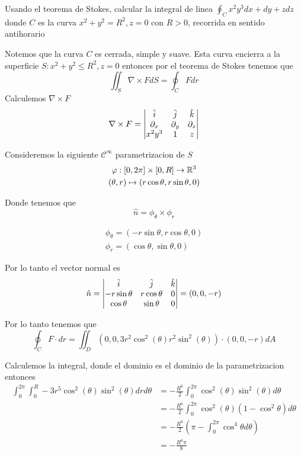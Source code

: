 \message{ !name(MAT024.tex)}\documentclass[../main.tex]{subfiles}
\begin{document}
\begin{problem}
Usando el teorema de Stokes, calcular la integral de linea $\oint_{C} x^{2}y^{3} dx + dy + z dz$ donde $C$ es la curva $x^{2} + y^{2} = R^{2}, z = 0$ con $R > 0$, recorrida en sentido antihorario
\end{problem}
\begin{solution}
  Notemos que la curva $C$ es cerrada, simple y suave. Esta curva encierra a la superficie $S: x^{2} + y^{2} \leq R^{2}, z = 0$ entonces por el teorema de Stokes tenemos que
  \begin{equation*}
    \iint_{S} \nabla \times F dS = \oint_{C} F dr
  \end{equation*}
  Calculemos $\nabla \times F$
  \begin{equation*}
    \nabla \times F = \begin{vmatrix} \hat{i} & \hat{j} & \hat{k}\\ \partial_x & \partial_y & \partial_z\\ x^{2}y^{3} & 1 & z\end{vmatrix}
  \end{equation*}

  Consideremos la siguiente $\mathcal{C}^{\infty}$ parametrizacion de $S$
  \begin{gather*}
    \varphi : [0, 2\pi] \times [0, R] \to \mathbb{R}^{3}\\
    (\theta, r) \mapsto (r \cos \theta, r \sin \theta, 0)
  \end{gather*}

  Donde tenemos que
  \begin{equation*}
    \hat{n} = \phi_{\theta} \times \phi_{r}
  \end{equation*}

  \begin{gather*}
    \phi_{\theta} = (-r \sin \theta, r \cos \theta, 0)\\
    \phi_{r} = (\cos \theta, \sin \theta, 0)
  \end{gather*}

  Por lo tanto el vector normal es
  \begin{equation*}
    \hat{n} = \begin{vmatrix} \hat{i} & \hat{j} & \hat{k}\\ -r \sin \theta & r \cos \theta & 0\\ \cos \theta & \sin \theta & 0\end{vmatrix} = (0, 0, -r)
  \end{equation*}

  Por lo tanto tenemos que
  \begin{equation*}
    \oint_{C} F \cdot dr = \iint_{D} (0, 0, 3r^{2}\cos^{2}(\theta) r^{2} \sin^{2}(\theta)) \cdot (0, 0, -r) dA
  \end{equation*}

  Calculemos la integral, donde el dominio es el dominio de la parametrizacion entonces
  \begin{align*}
    \int_{0}^{2\pi}\int_{0}^{R} -3r^{5}\cos^{2}(\theta)\sin^{2}(\theta) drd\theta &= -\frac{R^{6}}{2} \int_{0}^{2\pi}\cos^{2}(\theta)\sin^{2}(\theta) d\theta\\
                                                                                  &= -\frac{R^{6}}{2} \int_{0}^{2\pi} \cos^{2}(\theta)(1 - \cos^{2} \theta) d\theta\\
                                                                                  &= -\frac{R^{6}}{2} (\pi - \int_{0}^{2\pi} \cos^{4} \theta d \theta)\\
    &= -\frac{R^{6}\pi}{8}
  \end{align*}
\end{solution}
\end{document}
